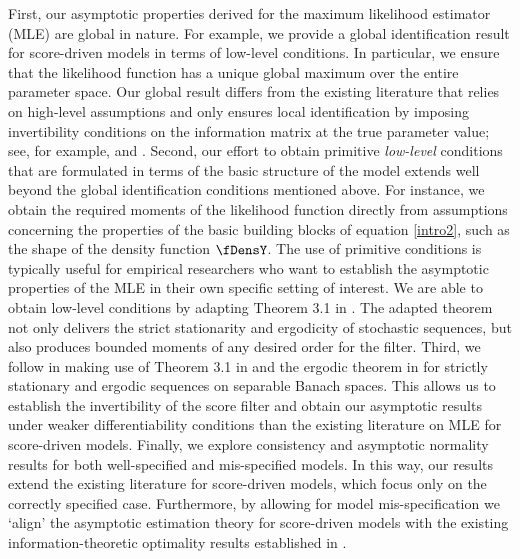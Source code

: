First,  our asymptotic properties derived for the maximum likelihood estimator (MLE) are  global in nature.  For example, we provide a global identification result for score-driven models in terms of low-level conditions. 
In particular, we ensure that the likelihood function has a unique global maximum over the entire parameter space. 
Our global result differs from the existing literature that relies on high-level assumptions and only ensures local identification by imposing invertibility conditions on the information matrix at the true parameter value;
see, for example, \cite{smikosch2006} and \cite{harvey2013}.
%
Second, our effort to obtain  primitive \textit{low-level} conditions that are formulated in terms of the basic structure of the model extends well beyond the global identification conditions mentioned above.
For instance, we obtain the required moments of the likelihood function directly from assumptions concerning the properties of the basic building blocks of equation \eqref{intro2}, such as the shape of the density function $\fDensY$.
The use of primitive conditions is typically useful for empirical researchers who want to establish the asymptotic properties of the MLE in their own specific setting of interest. We are able to  obtain low-level conditions by adapting Theorem 3.1 in \cite{bougerol1993}. The adapted theorem not only delivers the strict stationarity and ergodicity of stochastic sequences, but also produces bounded moments of any desired order for the filter.
%
Third, we follow  \cite{smikosch2006} in making use of Theorem 3.1 in \cite{bougerol1993} and the ergodic theorem in \cite{rao1962} for strictly stationary and ergodic sequences on separable Banach spaces. This allows us to establish the invertibility of the score filter and obtain our asymptotic results under weaker differentiability conditions than the existing literature on MLE for score-driven models. 
%
Finally, we explore consistency and asymptotic normality results for both well-specified and mis-specified models.
In this way, our results extend the existing literature for score-driven models, which focus only on the correctly specified case. Furthermore, by allowing for model mis-specification we `align' the asymptotic estimation theory for score-driven models with the existing information-theoretic optimality results established in \citet{blasqueskoopmanlucas2015opt}. 

